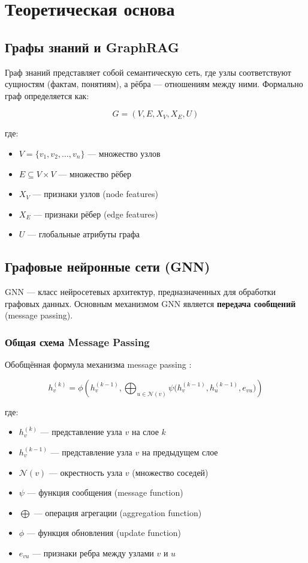 \documentclass[12pt,a4paper]{article}
\begin{document}
\section{Теоретическая основа}

\subsection{Графы знаний и GraphRAG}
Граф знаний представляет собой семантическую сеть, где узлы соответствуют сущностям (фактам, понятиям), а рёбра — отношениям между ними. Формально граф определяется как:

\begin{equation}
G = (V, E, X_V, X_E, U)
\end{equation}

где:
\begin{itemize}
    \item $V = \{v_1, v_2, \dots, v_n\}$ — множество узлов
    \item $E \subseteq V \times V$ — множество рёбер
    \item $X_V$ — признаки узлов (node features)
    \item $X_E$ — признаки рёбер (edge features)
    \item $U$ — глобальные атрибуты графа
\end{itemize}

\subsection{Графовые нейронные сети (GNN)}
GNN — класс нейросетевых архитектур, предназначенных для обработки графовых данных. Основным механизмом GNN является \textbf{передача сообщений} (message passing).

\subsubsection{Общая схема Message Passing}
Обобщённая формула механизма message passing \cite{gilmer2017neural}:

\begin{equation}
\boxed{
h_v^{(k)} = \phi \left( 
    h_v^{(k-1)}, 
    \bigoplus_{u \in \mathcal{N}(v)} 
    \psi\bigl(h_v^{(k-1)}, h_u^{(k-1)}, e_{vu}\bigr) 
\right)
}
\end{equation}

где:
\begin{itemize}
    \item $h_v^{(k)}$ — представление узла $v$ на слое $k$
    \item $h_v^{(k-1)}$ — представление узла $v$ на предыдущем слое
    \item $\mathcal{N}(v)$ — окрестность узла $v$ (множество соседей)
    \item $\psi$ — функция сообщения (message function)
    \item $\bigoplus$ — операция агрегации (aggregation function)
    \item $\phi$ — функция обновления (update function)
    \item $e_{vu}$ — признаки ребра между узлами $v$ и $u$
\end{itemize}
\end{document}
